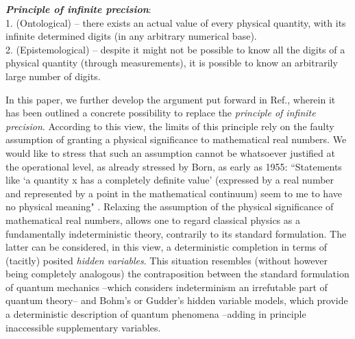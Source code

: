\documentclass[12pt]{article}
\begin{document}
\textbf{\emph{Principle of infinite precision}}:\\
1. (Ontological) -- there exists an actual value of every physical quantity, with its infinite determined digits (in any arbitrary numerical base).\\
2. (Epistemological) -- despite it might not be possible to know all the digits of a physical quantity (through measurements), it is possible to know an arbitrarily large number of digits. 

In this paper, we further develop the argument put forward in Ref.\cite{gisin1}, wherein it has been outlined a concrete possibility to replace the \emph{principle of infinite precision}. According to this view, the limits of this principle rely on the faulty assumption of granting a physical significance to mathematical real numbers. We would like to stress that such an assumption cannot be whatsoever justified at the operational level, as already stressed by Born, as early as 1955: ``Statements like `a quantity x has a completely definite value' (expressed by a real number and represented by a point in the mathematical continuum) seem to me to have no physical meaning" \cite{born}. Relaxing the assumption of the physical significance of mathematical real numbers, allows one to regard classical physics as a fundamentally indeterministic theory, contrarily to its standard formulation. The latter can be considered, in this view, a deterministic completion in terms of (tacitly) posited \emph{hidden variables}. This situation resembles (without however being completely analogous) the contraposition between the standard formulation of quantum mechanics --which considers indeterminism an irrefutable part of quantum theory-- and Bohm's \cite{bohm} or Gudder's \cite{gudder} hidden variable models, which provide a deterministic description of quantum phenomena --adding in principle inaccessible supplementary variables.
\end{document}
